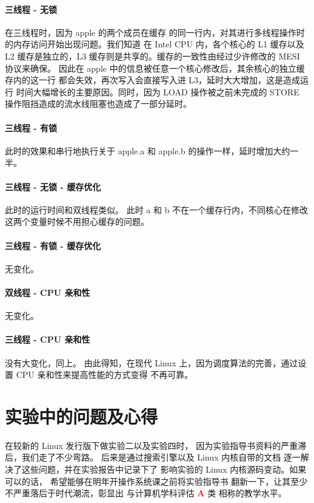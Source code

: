 \documentclass[blue,normal,cn]{elegantnote}
\begin{document}
\paragraph{三线程 - 无锁} 在三线程时，因为 apple 的两个成员在缓存
的同一行内，对其进行多线程操作时的内存访问开始出现问题。我们知道
在 Intel CPU 内，各个核心的 L1 缓存以及 L2 缓存是独立的，L3 
缓存则是共享的。缓存的一致性由经过少许修改的 MESI 协议来确保。
因此在 apple 中的信息被任意一个核心修改后，其余核心的独立缓存内的这一行
都会失效，再次写入会直接写入进 L3，延时大大增加，这是造成运行
时间大幅增长的主要原因。同时，因为 LOAD 操作被之前未完成的 STORE 
操作阻挡造成的流水线阻塞也造成了一部分延时。

\paragraph{三线程 - 有锁}
此时的效果和串行地执行关于 apple.a 和 apple.b 的操作一样，延时增加大约一半。

\paragraph{三线程 - 无锁 - 缓存优化}
此时的运行时间和双线程类似。
此时 a 和 b 不在一个缓存行内，不同核心在修改这两个变量时候不用担心缓存的问题。

\paragraph{三线程 - 有锁 - 缓存优化}
无变化。

\paragraph{双线程 - CPU 亲和性}
无变化。

\paragraph{三线程 - CPU 亲和性}
没有大变化，同上。
由此得知，在现代 Linux 上，因为调度算法的完善，通过设置 CPU 亲和性来提高性能的方式变得
不再可靠。

\section{实验中的问题及心得}

在较新的 Linux 发行版下做实验二以及实验四时，
因为实验指导书资料的严重滞后，我们走了不少弯路。
后来是通过搜索引擎以及 Linux 内核自带的文档
逐一解决了这些问题，并在实验报告中记录下了
影响实验的 Linux 内核源码变动。如果可以的话，
希望能够在明年开操作系统课之前将实验指导书
翻新一下，让其至少不严重落后于时代潮流，彰显出
与计算机学科评估 {\textcolor{red}{\LARGE{\textbf{A}}}} 类
相称的教学水平。
\end{document}
